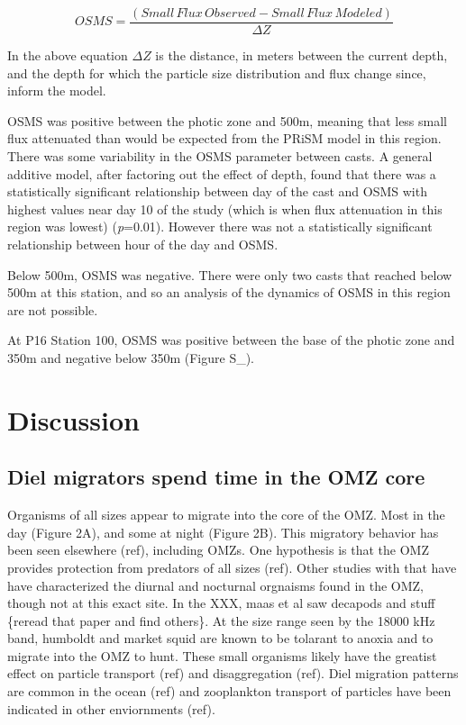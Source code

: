 \documentclass[]{article}
\begin{document}
\begin{equation}
OSMS = \frac{(Small\,Flux\,Observed - Small\,Flux\,Modeled)}{\Delta Z}
\end{equation}

In the above equation \(\Delta Z\) is the distance, in meters between
the current depth, and the depth for which the particle size
distribution and flux change since, inform the model.

OSMS was positive between the photic zone and 500m, meaning that less
small flux attenuated than would be expected from the PRiSM model in
this region. There was some variability in the OSMS parameter between
casts. A general additive model, after factoring out the effect of
depth, found that there was a statistically significant relationship
between day of the cast and OSMS with highest values near day 10 of the
study (which is when flux attenuation in this region was lowest)
(\emph{p}=0.01). However there was not a statistically significant
relationship between hour of the day and OSMS.

Below 500m, OSMS was negative. There were only two casts that reached
below 500m at this station, and so an analysis of the dynamics of OSMS
in this region are not possible.

At P16 Station 100, OSMS was positive between the base of the photic
zone and 350m and negative below 350m (Figure S\_).

\hypertarget{discussion}{%
\section{Discussion}\label{discussion}}

\hypertarget{diel-migrators-spend-time-in-the-omz-core}{%
\subsection{Diel migrators spend time in the OMZ
core}\label{diel-migrators-spend-time-in-the-omz-core}}

Organisms of all sizes appear to migrate into the core of the OMZ. Most
in the day (Figure 2A), and some at night (Figure 2B). This migratory
behavior has been seen elsewhere (ref), including OMZs. One hypothesis
is that the OMZ provides protection from predators of all sizes (ref).
Other studies with that have have characterized the diurnal and
nocturnal orgnaisms found in the OMZ, though not at this exact site. In
the XXX, maas et al saw decapods and stuff \{reread that paper and find
others\}. At the size range seen by the 18000 kHz band, humboldt and
market squid are known to be tolarant to anoxia and to migrate into the
OMZ to hunt. These small organisms likely have the greatist effect on
particle transport (ref) and disaggregation (ref). Diel migration
patterns are common in the ocean (ref) and zooplankton transport of
particles have been indicated in other enviornments (ref).
\end{document}
